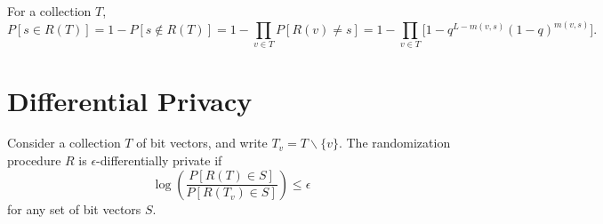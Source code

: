\documentclass[11pt,draft]{amsart}
\begin{document}
For a collection $T$,
\[ 
    P[s \in R(T)] = 1-P[s \not\in R(T)] = 1-\prod_{v \in T} P[R(v) \neq s]
    = 1-\prod_{v \in T} \big[1 - q^{L-m(v,s)}(1-q)^{m(v,s)} \big].
\]

\section{Differential Privacy}

Consider a collection $T$ of bit vectors, and write $T_v = T\backslash\{v\}$.
The randomization procedure $R$ is $\epsilon$-differentially private if
\[ \log\left(\frac{P[R(T)\in S]}{P[R(T_v)\in S]}\right) \leq \epsilon \]
for any set of bit vectors $S$.
\end{document}
